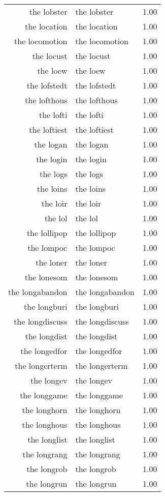 \begin{table}[ht]
\begin{tabular}{rlr}
  the lobster & the lobster & 1.00 \\ 
  the location & the location & 1.00 \\ 
  the locomotion & the locomotion & 1.00 \\ 
  the locust & the locust & 1.00 \\ 
  the loew & the loew & 1.00 \\ 
  the lofstedt & the lofstedt & 1.00 \\ 
  the lofthous & the lofthous & 1.00 \\ 
  the lofti & the lofti & 1.00 \\ 
  the loftiest & the loftiest & 1.00 \\ 
  the logan & the logan & 1.00 \\ 
  the login & the login & 1.00 \\ 
  the logs & the logs & 1.00 \\ 
  the loins & the loins & 1.00 \\ 
  the loir & the loir & 1.00 \\ 
  the lol & the lol & 1.00 \\ 
  the lollipop & the lollipop & 1.00 \\ 
  the lompoc & the lompoc & 1.00 \\ 
  the loner & the loner & 1.00 \\ 
  the lonesom & the lonesom & 1.00 \\ 
  the longabandon & the longabandon & 1.00 \\ 
  the longburi & the longburi & 1.00 \\ 
  the longdiscuss & the longdiscuss & 1.00 \\ 
  the longdist & the longdist & 1.00 \\ 
  the longedfor & the longedfor & 1.00 \\ 
  the longerterm & the longerterm & 1.00 \\ 
  the longev & the longev & 1.00 \\ 
  the longgame & the longgame & 1.00 \\ 
  the longhorn & the longhorn & 1.00 \\ 
  the longhous & the longhous & 1.00 \\ 
  the longlist & the longlist & 1.00 \\ 
  the longrang & the longrang & 1.00 \\ 
  the longrob & the longrob & 1.00 \\ 
  the longrun & the longrun & 1.00 \\ 

\end{tabular}
\end{table}
